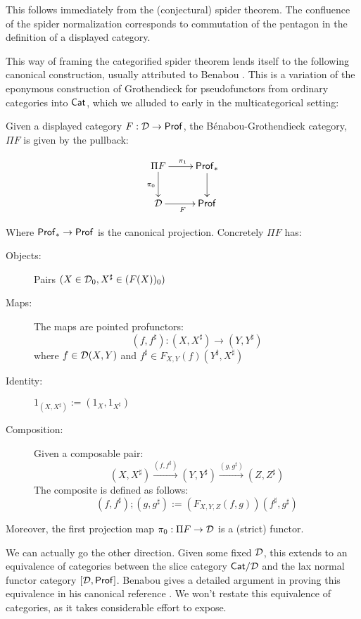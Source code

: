 This follows immediately from the  (conjectural) spider theorem.
The confluence of the spider normalization corresponds to commutation of the pentagon in the definition of a displayed category.

This way of framing the categorified spider theorem lends itself to the following canonical construction, usually attributed to Benabou \cite{benabou}. This is a variation of the eponymous construction of Grothendieck for pseudofunctors from ordinary categories into ${\sf Cat}$, which we alluded to early in the multicategorical setting:



\begin{theorem}

Given a displayed category $F:\mathcal{D}\to {\sf Prof}$, the B\'enabou-Grothendieck category,  $\Pi F$ is given by the pullback:

$$
\xymatrix{
\Pi  F \ar[r]^{\pi_1} \ar[d]_{\pi_0} & \Prof_* \ar[d] \\
\D \ar[r]_F & \Prof
}
$$

Where ${\sf Prof}_* \to {\sf Prof}$ is the canonical projection.
Concretely $\Pi F$ has:


\begin{description}
\item[Objects:] Pairs $(X\in \mathcal{D}_0, X^\sharp \in (F(X))_0)$
\item[Maps:] The maps are  pointed profunctors:
$$(f, f^\sharp):(X,X^\sharp )\to (Y,Y^\sharp)$$
 where $f \in \mathcal{D}(X,Y)$ and $f^\sharp \in F_{X,Y}(f)(Y^\sharp,X^\sharp)$
\item[Identity:] $1_{(X,X^\sharp)} := (1_X, 1_{X^\sharp})$
\item[Composition:] Given a composable pair:
$$(X,X^\sharp)\xrightarrow{(f, f^\sharp)} (Y,Y^\sharp)\xrightarrow{(g, g^\sharp)} (Z,Z^\sharp)$$
The composite is defined as follows:
$$(f, f^\sharp);(g, g^\sharp):= (F_{X,Y,Z}(f,g))(f^\sharp, g^\sharp)$$
\end{description}


Moreover, the first projection map $\pi_0:\Pi F\to \mathcal{D}$  is a (strict) functor.
\end{theorem}



We can actually go the other direction.  Given some fixed $\mathcal{D}$, this extends to an equivalence of categories between the slice category ${\sf Cat}/\mathcal{D}$ and the lax normal functor category $[\mathcal{D},{\sf Prof}]$.  Benabou gives a detailed argument in proving this equivalence in his canonical reference \cite{benaboudist}.  We won't restate this equivalence of categories, as it takes considerable effort to expose.





